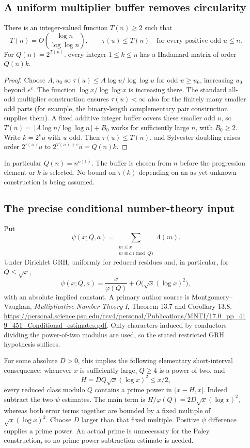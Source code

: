 \subsection{A uniform multiplier buffer removes circularity}
\begin{lemma}
There is an integer-valued function $T(n)\ge2$ such that
\[
 T(n)=O\!\left(\frac{\log n}{\log\log n}\right),
 \qquad \tau(u)\le T(n)\quad
 \text{for every positive odd }u\le n.
\]
For $Q(n)=2^{T(n)}$, every integer $1\le k\le n$ has a Hadamard
matrix of order $Q(n)k$.
\end{lemma}
\begin{proof}
Choose $A,u_0$ so $\tau(u)\le A\log u/\log\log u$ for odd
$u\ge u_0$, increasing $u_0$ beyond $e^e$. The function
$\log x/\log\log x$ is increasing there. The standard all-odd
multiplier construction ensures $\tau(u)<\infty$ also for the finitely
many smaller odd parts (for example, the binary-length complementary
pair construction supplies them). A fixed additive integer buffer
covers these smaller odd $u$, so
$T(n)=\lceil A\log n/\log\log n\rceil+B_0$ works for sufficiently
large $n$, with $B_0\ge2$. Write $k=2^vu$ with $u$ odd. Then
$\tau(u)\le T(n)$, and Sylvester doubling raises order
$2^{\tau(u)}u$ to $2^{T(n)+v}u=Q(n)k$.
\end{proof}

In particular $Q(n)=n^{o(1)}$. The buffer is chosen from $n$ before
the progression element or $k$ is selected. No bound on $\tau(k)$
depending on an as-yet-unknown construction is being assumed.

\subsection{The precise conditional number-theory input}
Put
\[
 \psi(x;Q,a)=\sum_{\substack{m\le x\\m\equiv a\pmod Q}}\Lambda(m).
\]
Under Dirichlet GRH, uniformly for reduced residues and, in particular,
for $Q\le\sqrt x$,
\[
 \psi(x;Q,a)=\frac{x}{\varphi(Q)}+
 O\bigl(\sqrt x(\log x)^2\bigr),
\]
with an absolute implied constant. A primary author source is
Montgomery--Vaughan, \emph{Multiplicative Number Theory I},
Theorem 13.7 and Corollary 13.8,
\url{https://personal.science.psu.edu/rcv4/personal/Publications/MNTI/17.0_pp_419_451_Conditional_estimates.pdf}.
Only characters induced by conductors dividing the power-of-two
modulus are used, so the stated restricted GRH hypothesis suffices.

For some absolute $D>0$, this implies the following elementary
short-interval consequence: whenever $x$ is sufficiently large,
$Q\ge4$ is a power of two, and
\[
 H=DQ\sqrt x(\log x)^2\le x/2,
\]
every reduced class modulo $Q$ contains a prime power in $(x-H,x]$.
Indeed subtract the two $\psi$ estimates. The main term is
$H/\varphi(Q)=2D\sqrt x(\log x)^2$, whereas both error terms
together are bounded by a fixed multiple of
$\sqrt x(\log x)^2$. Choose $D$ larger than that fixed multiple.
Positive $\psi$ difference supplies a prime power. An actual prime
is unnecessary for the Paley construction, so no prime-power
subtraction estimate is needed.

